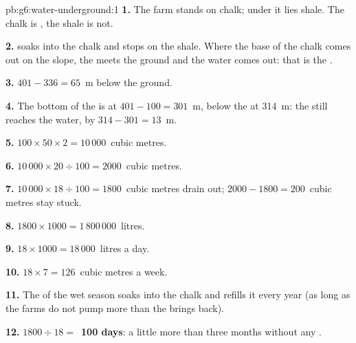 \begin{solution}{pb:g6:water-underground:1}
\textbf{1.} The farm stands on chalk; under it lies shale. The chalk is
, the shale is not.

\textbf{2.}  soaks into the chalk and stops on the shale. Where the
base of the chalk comes out on the slope, the  meets the ground
and the water comes out: that is the .

\textbf{3.} $401 - 336 = 65$~m below the ground.

\textbf{4.} The bottom of the  is at $401 - 100 = 301$~m, below the
 at 314~m: the  still reaches the water, by $314 - 301 =
13$~m.

\textbf{5.} $100 \times 50 \times 2 = 10\,000$~cubic metres.

\textbf{6.} $10\,000 \times 20 \div 100 = 2000$~cubic metres.

\textbf{7.} $10\,000 \times 18 \div 100 = 1800$~cubic metres drain out;
$2000 - 1800 = 200$~cubic metres stay stuck.

\textbf{8.} $1800 \times 1000 = 1\,800\,000$~litres.

\textbf{9.} $18 \times 1000 = 18\,000$~litres a day.

\textbf{10.} $18 \times 7 = 126$~cubic metres a week.

\textbf{11.} The  of the wet season soaks into the chalk and refills it
every year (as long as the farms do not pump more than the  brings back).

\textbf{12.} $1800 \div 18 = $~\textbf{100 days}: a little more than three
months without any .
\end{solution}
